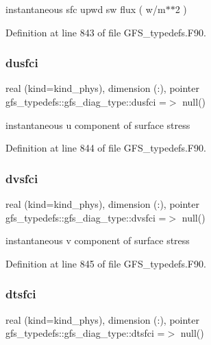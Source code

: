 instantaneous sfc upwd sw flux ( w/m$\ast$$\ast$2 ) 



Definition at line 843 of file G\+F\+S\+\_\+typedefs.\+F90.

\mbox{\label{structgfs__typedefs_1_1gfs__diag__type_a84049a98778435294494ba1bf96920f2}} 
\subsubsection{dusfci}
{\footnotesize\ttfamily real (kind=kind\+\_\+phys), dimension (\+:), pointer gfs\+\_\+typedefs\+::gfs\+\_\+diag\+\_\+type\+::dusfci =$>$ null()}



instantaneous u component of surface stress 



Definition at line 844 of file G\+F\+S\+\_\+typedefs.\+F90.

\mbox{\label{structgfs__typedefs_1_1gfs__diag__type_acd6ab847768546d85ef09f9d07a05aaa}} 
\subsubsection{dvsfci}
{\footnotesize\ttfamily real (kind=kind\+\_\+phys), dimension (\+:), pointer gfs\+\_\+typedefs\+::gfs\+\_\+diag\+\_\+type\+::dvsfci =$>$ null()}



instantaneous v component of surface stress 



Definition at line 845 of file G\+F\+S\+\_\+typedefs.\+F90.

\mbox{\label{structgfs__typedefs_1_1gfs__diag__type_a782ed634150b9cd20879d042306526ea}} 
\subsubsection{dtsfci}
{\footnotesize\ttfamily real (kind=kind\+\_\+phys), dimension (\+:), pointer gfs\+\_\+typedefs\+::gfs\+\_\+diag\+\_\+type\+::dtsfci =$>$ null()}



